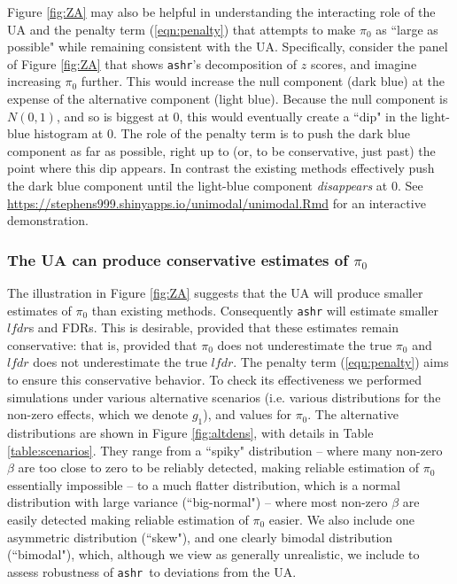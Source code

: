 \documentclass[11pt]{article}
\def\lfdr{\textit{lfdr}}
\def\ashr{{\tt ashr}\xspace}
\begin{document}
Figure \ref{fig:ZA} may also be helpful in understanding the interacting role of the UA and the penalty term (\ref{eqn:penalty}) that attempts to make $\pi_0$ as ``large as possible" while remaining consistent with the UA. Specifically, consider the panel of Figure \ref{fig:ZA} that shows \ashr's decomposition of $z$ scores, and imagine increasing $\pi_0$ further. This would increase the null component (dark blue) at the expense of
the alternative component (light blue). Because the null component is $N(0,1)$, and so is biggest at 0, this would eventually create a ``dip" in the light-blue histogram at 0. The role of the penalty term is to push the dark blue component as far as possible, right up to (or, to be conservative, just past) the point where this dip appears. In contrast the 
existing methods effectively push the dark blue component until the light-blue component {\it disappears} at 0. See \href{https://stephens999.shinyapps.io/unimodal/unimodal.Rmd}{https://stephens999.shinyapps.io/unimodal/unimodal.Rmd} for an interactive
demonstration.

 \subsubsection*{The UA can produce conservative estimates of $\pi_0$}

The illustration in Figure \ref{fig:ZA} suggests that the UA will produce smaller estimates of $\pi_0$ than existing methods.
Consequently \ashr will estimate smaller $\lfdr$s and FDRs. 
This is desirable, provided that these estimates remain conservative: that is,
provided that $\pi_0$ does not underestimate the true $\pi_0$ and $\lfdr$ does not underestimate the true $\lfdr$.
The penalty term (\ref{eqn:penalty}) aims to ensure this conservative behavior. To check its effectiveness
we performed simulations under various alternative scenarios (i.e. various distributions for the non-zero effects, which we denote $g_1$), and values
for $\pi_0$. The alternative distributions are shown in Figure \ref{fig:altdens}, with details in Table \ref{table:scenarios}.
They range from a ``spiky" distribution -- where many non-zero $\beta$ are
too close to  zero to be reliably detected, making reliable estimation of $\pi_0$ essentially impossible -- to a much
flatter distribution, which is a normal distribution with large variance (``big-normal") -- where most non-zero $\beta$ are easily detected
making reliable estimation of $\pi_0$ easier. We also include one asymmetric distribution (``skew"), and one clearly bimodal distribution (``bimodal"),
which, although we view as generally unrealistic, we include to assess robustness of \ashr~to deviations from the UA.
\end{document}

